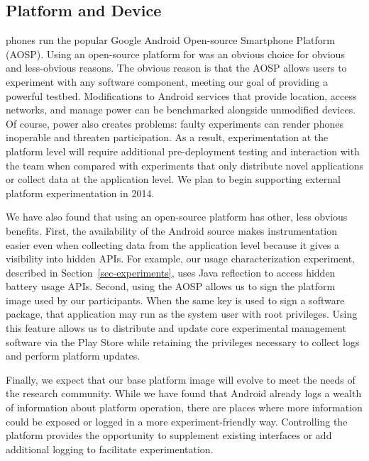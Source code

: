 

\subsection{Platform and Device}

\PhoneLab{} phones run the popular Google Android Open-source Smartphone
Platform (AOSP). Using an open-source platform for \PhoneLab{} was an obvious
choice for obvious and less-obvious reasons. The obvious reason is that the
AOSP allows \PhoneLab{} users to experiment with any software component,
meeting our goal of providing a powerful testbed. Modifications to Android
services that provide location, access networks, and manage power can be
benchmarked alongside unmodified devices. Of course, power also creates
problems: faulty experiments can render phones inoperable and threaten
participation. As a result, experimentation at the platform level will
require additional pre-deployment testing and interaction with the
\PhoneLab{} team when compared with experiments that only distribute novel
applications or collect data at the application level. We plan to begin
supporting external platform experimentation in 2014.

We have also found that using an open-source platform has other, less obvious
benefits. First, the availability of the Android source makes \PhoneLab{}
instrumentation easier even when collecting data from the application level
because it gives a visibility into hidden APIs. For example, our usage
characterization experiment, described in Section~\ref{sec-experiments}, uses
Java reflection to access hidden battery usage APIs. Second, using the AOSP
allows us to sign the platform image used by our participants. When the same
key is used to sign a software package, that application may run as the
system user with root privileges. Using this feature allows us to distribute
and update core \PhoneLab{} experimental management software via the Play
Store while retaining the privileges necessary to collect logs and perform
platform updates.

Finally, we expect that our base \PhoneLab{} platform image will evolve to
meet the needs of the research community. While we have found that Android
already logs a wealth of information about platform operation, there are
places where more information could be exposed or logged in a more
experiment-friendly way. Controlling the platform provides the opportunity to
supplement existing interfaces or add additional logging to facilitate
experimentation.

